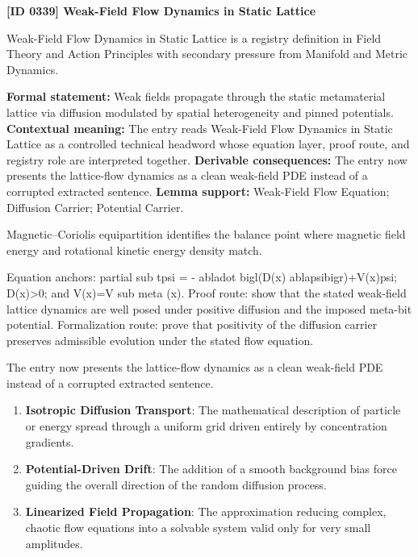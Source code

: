 \clearpage
\noindent\textbf{[ID 0339] Weak-Field Flow Dynamics in Static Lattice}\par
\vspace{0.35em}
\begingroup\small
{}
Weak-Field Flow Dynamics in Static Lattice is a registry definition in Field Theory and Action Principles with secondary pressure from Manifold and Metric Dynamics.

\begingroup\footnotesize\setlength{\emergencystretch}{3em}\sloppy
\textbf{Formal statement:} Weak fields propagate through the static metamaterial lattice via diffusion modulated by spatial heterogeneity and pinned potentials. \textbf{Contextual meaning:} The entry reads Weak-Field Flow Dynamics in Static Lattice as a controlled technical headword whose equation layer, proof route, and registry role are interpreted together. \textbf{Derivable consequences:} The entry now presents the lattice-flow dynamics as a clean weak-field PDE instead of a corrupted extracted sentence. \textbf{Lemma support:} Weak-Field Flow Equation; Diffusion Carrier; Potential Carrier.\par
\endgroup

Magnetic--Coriolis equipartition identifies the balance point where magnetic field energy and rotational kinetic energy density match.

Equation anchors: partial sub tpsi = - abladot bigl(D(x) ablapsibigr)+V(x)psi; D(x)>0; and V(x)=V sub meta (x). Proof route: show that the stated weak-field lattice dynamics are well posed under positive diffusion and the imposed meta-bit potential. Formalization route: prove that positivity of the diffusion carrier preserves admissible evolution under the stated flow equation.

The entry now presents the lattice-flow dynamics as a clean weak-field PDE instead of a corrupted extracted sentence.
\endgroup

\begin{enumerate}[leftmargin=1.6em,itemsep=6pt,topsep=4pt]
\item \textbf{Isotropic Diffusion Transport}: The mathematical description of particle or energy spread through a uniform grid driven entirely by concentration gradients.
\item \textbf{Potential-Driven Drift}: The addition of a smooth background bias force guiding the overall direction of the random diffusion process.
\item \textbf{Linearized Field Propagation}: The approximation reducing complex, chaotic flow equations into a solvable system valid only for very small amplitudes.
\end{enumerate}

